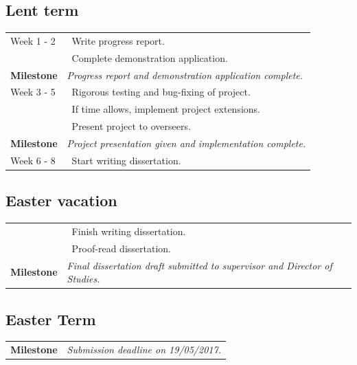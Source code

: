 \documentclass[a4paper, 12pt]{article}
\newcommand{\tbf}[1]{\textbf{#1}}
\newcommand{\tit}[1]{\textit{#1}}
\newcommand{\bpt}[0]{\textbullet~}
\begin{document}
\subsection*{Lent term}
\begin{tabular}{l | l}
	Week 1 - 2 & \bpt Write progress report. \\
	& \bpt Complete demonstration application. \\
	\tbf{Milestone} & \tit{Progress report and demonstration application complete.} \\ \hline
	Week 3 - 5 & \bpt Rigorous testing and bug-fixing of project. \\
	& \bpt If time allows, implement project extensions. \\
	& \bpt Present project to overseers. \\
	\tbf{Milestone} & \tit{Project presentation given and implementation complete.} \\ \hline
	Week 6 - 8 & \bpt Start writing dissertation. \\
\end{tabular}

\subsection*{Easter vacation}
\begin{tabular}{l | l}
	& \bpt Finish writing dissertation. \\
	& \bpt Proof-read dissertation. \\
	\tbf{Milestone} & \tit{Final dissertation draft submitted to supervisor and Director of Studies.} \\
\end{tabular}

\subsection*{Easter Term}
\begin{tabular}{l | l}
	\tbf{Milestone} & \tit{Submission deadline on 19/05/2017.}
\end{tabular}
\end{document}
